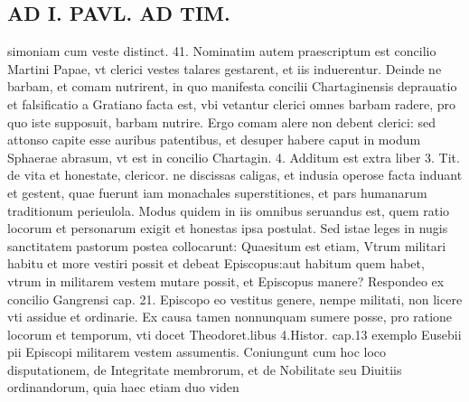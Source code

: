 \documentclass{article}
\begin{document}
\begin{pages}
\section*{AD I. PAVL. AD TIM. }
\marginpar{[ p.422 ]}\pstart simoniam cum veste distinct. 41.  \pend\pstart Nominatim autem praescriptum est concilio Martini Papae, vt clerici vestes talares gestarent, et iis induerentur. Deinde ne barbam, et comam nutrirent, in quo manifesta concilii Chartaginensis deprauatio et falsificatio a Gratiano facta est, vbi vetantur clerici omnes barbam radere, pro quo iste supposuit, barbam nutrire. Ergo comam alere non debent clerici: sed attonso capite esse auribus patentibus, et desuper habere caput in modum Sphaerae abrasum, vt est in concilio Chartagin. 4. Additum est extra liber 3. Tit. de vita et honestate, clericor. ne discissas caligas, et indusia operose facta induant et gestent, quae fuerunt iam monachales superstitiones, et pars humanarum traditionum perieulola. Modus quidem in iis omnibus seruandus est, quem ratio locorum et personarum exigit et honestas ipsa postulat. Sed istae leges in nugis sanctitatem pastorum postea collocarunt:  \pend\pstart Quaesitum est etiam, Vtrum militari habitu et more vestiri possit et debeat Episcopus:aut habitum quem habet, vtrum in militarem vestem mutare possit, et Episcopus manere? Respondeo ex concilio Gangrensi cap. 21. Episcopo eo vestitus genere, nempe militati, non licere vti assidue et ordinarie. Ex causa tamen nonnunquam sumere posse, pro ratione locorum et temporum, vti docet Theodoret.libus  4.Histor. cap.13 exemplo Eusebii pii Episcopi militarem vestem assumentis. Coniungunt cum hoc loco disputationem, de Integritate membrorum, et de Nobilitate seu Diuitiis ordinandorum, quia haec etiam duo viden\pend

\end{pages}
\end{document}
